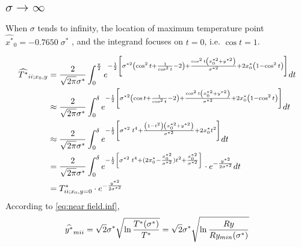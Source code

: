 \documentclass[review, 1p, number, sort&compress,table]{elsarticle}
\begin{document}
	\subsection{$\sigma\rightarrow{\infty}$}
	When $\sigma$ tends to infinity, the  location of maximum temperature point $\widehat{x^{*}}_0=-0.7650 \;\sigma^{*}$ , and  the integrand focuses on $t=0$, i.e. $\cos{t}=1$.

		\begin{align}
		\nonumber 
		\widehat{T^{*}}_{\uppercase\expandafter{\romannumeral2};x_0,y} &=\frac{2}{\sqrt{2\pi}\sigma^*}\int_{0}^{\frac{\pi}{2}} e^{-\frac{1}{2}\left[\sigma^{*2}\left(\cos^2{t}+\frac{1}{\cos^2{t}}-2 \right)+\frac{\cos^2{t}\left(x_0^{*2}+y^{*2}\right)}{\sigma^{*2}}+2x_0^{*}\left( 1-\cos^2{t} \right)\right] }dt
		\\ \nonumber
		&\approx  \frac{2}{\sqrt{2\pi}\sigma^*}\int_{0}^{\delta} e^{-\frac{1}{2}\left[\sigma^{*2}\left(\cos{t}+\frac{1}{\cos^2{t}}-2 \right)+\frac{\cos^2{t} \left(x_0^{*2}+y^{*2}\right) }{\sigma^{*2}}+2x_0^{*}\left( 1-\cos^2{t} \right)\right] }dt
		\\ \nonumber
		&\approx  \frac{2}{\sqrt{2\pi}\sigma^*}\int_{0}^{\delta} e^{-\frac{1}{2}\left[\sigma^{*2}\;t^4+\frac{\left(1-t^2\right)\left(x_0^{*2}+y^{*2}\right) }{\sigma^{*2}}+2x_0^{*}t^2 \right] }dt
		\\ \nonumber		
		&= \frac{2}{\sqrt{2\pi}\sigma^*}\int_{0}^{\delta} e^{-\frac{1}{2}\left[\sigma^{*2}\;t^4+(2x_0^{*}-\frac{x_0^{*2}}{\sigma^{*2}})t^2 +\frac{x_0^{*2}}{\sigma^{*2}}\right]}\cdot e^{-\frac{y^{*2}}{2\sigma^{*2}}}dt
		\\ 
		&=	 T^{*}_{\uppercase\expandafter{\romannumeral2};x_0,y=0}\cdot
		e^{-\frac{y^{*2}}{2\sigma^{*2}}} \label{eq:near field.inf}
		\end{align}
		According to \autoref{eq:near field.inf},
		\begin{equation} \label{eq:Sm.inf}
		\widehat{y^{*}}_{m\uppercase\expandafter{\romannumeral2}} = \sqrt{2}\sigma^{*}\sqrt{\ln{\frac{T^{*}(\sigma^{*})}{T^{*}}}}=\sqrt {2}\sigma^{*}\sqrt{\ln{\frac{Ry}{Ry_{min}(\sigma^{*})}}}
		\end{equation}
\end{document}
